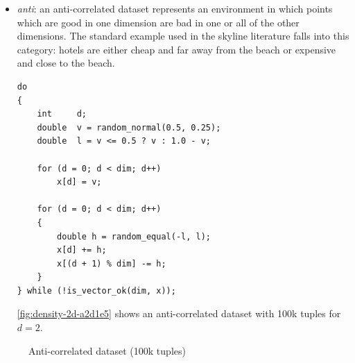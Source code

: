 \begin{itemize}
\pagebreak[3]

\item \emph{anti}:
an anti-correlated dataset represents an environment in which points
which are good in one dimension are bad in one or all of the other
dimensions. The standard example used in the skyline literature falls
into this category: hotels are either cheap and far away from the
beach or expensive and close to the beach.

\begin{lstlisting}
do
{
	int		d;
	double	v = random_normal(0.5, 0.25);
	double	l = v <= 0.5 ? v : 1.0 - v;
			
	for (d = 0; d < dim; d++)
		x[d] = v;
		
	for (d = 0; d < dim; d++)
	{
		double h = random_equal(-l, l);
		x[d] += h;
		x[(d + 1) % dim] -= h;
	}
} while (!is_vector_ok(dim, x));
\end{lstlisting}

\autoref{fig:density-2d-a2d1e5} shows an anti-correlated dataset
with 100k tuples for $d = 2$.
\end{itemize}

\begin{figure}[htbp]
\centering
{}%
%
\caption{Anti-correlated dataset (100k tuples)}%
\label{fig:density-2d-a2d1e5}%
\end{figure}

